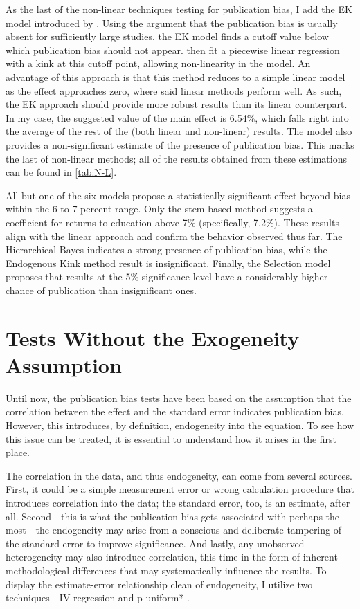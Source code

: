 As the last of the non-linear techniques testing for publication bias, I add the \ac{EK} model introduced by \cite{Bom2019Kink}. Using the argument that the publication bias is usually absent for sufficiently large studies, the \ac{EK} model finds a cutoff value below which publication bias should not appear. \cite{Bom2019Kink} then fit a piecewise linear regression with a kink at this cutoff point, allowing non-linearity in the model. An advantage of this approach is that this method reduces to a simple linear model as the effect approaches zero, where said linear methods perform well. As such, the \ac{EK} approach should provide more robust results than its linear counterpart. In my case, the suggested value of the main effect is 6.54\%, which falls right into the average of the rest of the (both linear and non-linear) results. The model also provides a non-significant estimate of the presence of publication bias. This marks the last of non-linear methods; all of the results obtained from these estimations can be found in \autoref{tab:N-L}.

All but one of the six models propose a statistically significant effect beyond bias within the 6 to 7 percent range. Only the stem-based method suggests a coefficient for returns to education above 7\% (specifically, 7.2\%). These results align with the linear approach and confirm the behavior observed thus far. The Hierarchical Bayes indicates a strong presence of publication bias, while the Endogenous Kink method result is insignificant. Finally, the Selection model proposes that results at the 5\% significance level have a considerably higher chance of publication than insignificant ones.


\section{Tests Without the Exogeneity Assumption}
\label{sec:exo_tests}

Until now, the publication bias tests have been based on the assumption that the correlation between the effect and the standard error indicates publication bias. However, this introduces, by definition, endogeneity into the equation. To see how this issue can be treated, it is essential to understand how it arises in the first place.

The correlation in the data, and thus endogeneity, can come from several sources. First, it could be a simple measurement error or wrong calculation procedure that introduces correlation into the data; the standard error, too, is an estimate, after all. Second - this is what the publication bias gets associated with perhaps the most - the endogeneity may arise from a conscious and deliberate tampering of the standard error to improve significance. And lastly, any unobserved heterogeneity may also introduce correlation, this time in the form of inherent methodological differences that may systematically influence the results. To display the estimate-error relationship clean of endogeneity, I utilize two techniques - \ac{IV} regression and p-uniform* \citep{vanAert2021puni}.

